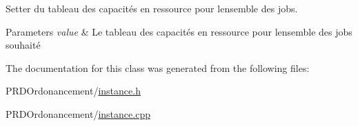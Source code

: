 Setter du tableau des capacités en ressource pour l\textquotesingle{}ensemble des jobs. 


\begin{DoxyParams}{Parameters}
{\em value} & Le tableau des capacités en ressource pour l\textquotesingle{}ensemble des jobs souhaité \\
\hline
\end{DoxyParams}


The documentation for this class was generated from the following files\+:\begin{DoxyCompactItemize}
\item 
P\+R\+D\+Ordonancement/\hyperlink{instance_8h}{instance.\+h}\item 
P\+R\+D\+Ordonancement/\hyperlink{instance_8cpp}{instance.\+cpp}\end{DoxyCompactItemize}
